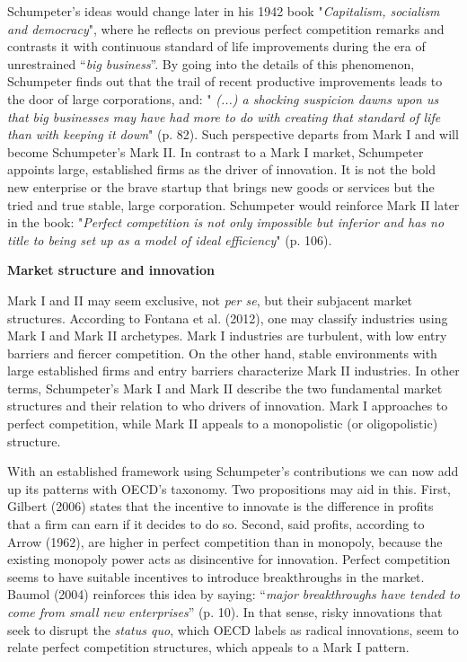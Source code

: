 \documentclass[12pt,a4paper]{article}
\begin{document}
Schumpeter's ideas would change later in his 1942 book "\textit{Capitalism, socialism and democracy}", where he reflects on previous perfect competition remarks and contrasts it with continuous standard of life improvements during the era of unrestrained “\textit{big business}”. By going into the details of this phenomenon, Schumpeter finds out that the trail of recent productive improvements leads to the door of large corporations, and: "\textit{ (...) a shocking suspicion dawns upon us that big businesses may have had more to do with creating that standard of life than with keeping it down}" (p. 82). Such perspective departs from Mark I and will become Schumpeter's Mark II. In contrast to a Mark I market, Schumpeter appoints large, established firms as the driver of innovation. It is not the bold new enterprise or the brave startup that brings new goods or services but the tried and true stable, large corporation. Schumpeter would reinforce Mark II later in the book: "\textit{Perfect competition is not only impossible but inferior and has no title to being set up as a model of ideal efficiency}" (p. 106).   

\noindent \textbf{Market structure and innovation }

Mark I and II may seem exclusive, not \textit{per se}, but their subjacent market structures. According to Fontana et al. (2012), one may classify industries using Mark I and Mark II archetypes. Mark I industries are turbulent, with low entry barriers and fiercer competition. On the other hand, stable environments with large established firms and entry barriers characterize Mark II industries. In other terms, Schumpeter's Mark I and Mark II describe the two fundamental market structures and their relation to who drivers of innovation. Mark I approaches to perfect competition, while Mark II appeals to a monopolistic (or oligopolistic) structure. 

With an established framework using Schumpeter's contributions we can now add up its patterns with OECD's taxonomy. Two propositions may aid in this. First, Gilbert (2006) states that the incentive to innovate is the difference in profits that a firm can earn if it decides to do so. Second, said profits, according to Arrow (1962), are higher in perfect competition than in monopoly, because the existing monopoly power acts as disincentive for innovation. Perfect competition seems to have suitable incentives to introduce breakthroughs in the market. Baumol (2004) reinforces this idea by saying: “\textit{major breakthroughs have tended to come from small new enterprises}” (p. 10). In that sense, risky innovations that seek to disrupt the \textit{status quo}, which OECD labels as radical innovations, seem to relate perfect competition structures, which appeals to a Mark I pattern.  
\end{document}
